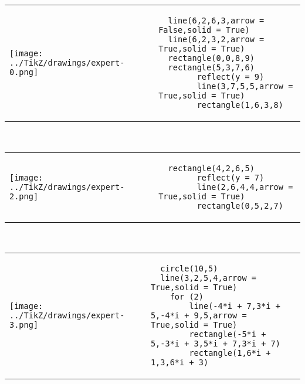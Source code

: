 
            \begin{tabular}{ll}
    \texttt{[image: ../TikZ/drawings/expert-0.png]}&
    
        \begin{minipage}{10cm}
        \begin{verbatim}
  line(6,2,6,3,arrow = False,solid = True)
  line(6,2,3,2,arrow = True,solid = True)
  rectangle(0,0,8,9)
  rectangle(5,3,7,6)
        reflect(y = 9)
        line(3,7,5,5,arrow = True,solid = True)
        rectangle(1,6,3,8)
        \end{verbatim}
\end{minipage}

    \end{tabular}        
            \\

            \begin{tabular}{ll}
    \texttt{[image: ../TikZ/drawings/expert-2.png]}&
    
        \begin{minipage}{10cm}
        \begin{verbatim}
  rectangle(4,2,6,5)
        reflect(y = 7)
        line(2,6,4,4,arrow = True,solid = True)
        rectangle(0,5,2,7)
        \end{verbatim}
\end{minipage}

    \end{tabular}        
            \\

            \begin{tabular}{ll}
    \texttt{[image: ../TikZ/drawings/expert-3.png]}&
    
        \begin{minipage}{10cm}
        \begin{verbatim}
  circle(10,5)
  line(3,2,5,4,arrow = True,solid = True)
    for (2)
        line(-4*i + 7,3*i + 5,-4*i + 9,5,arrow = True,solid = True)
        rectangle(-5*i + 5,-3*i + 3,5*i + 7,3*i + 7)
        rectangle(1,6*i + 1,3,6*i + 3)
        \end{verbatim}
\end{minipage}

    \end{tabular}        
            \\

